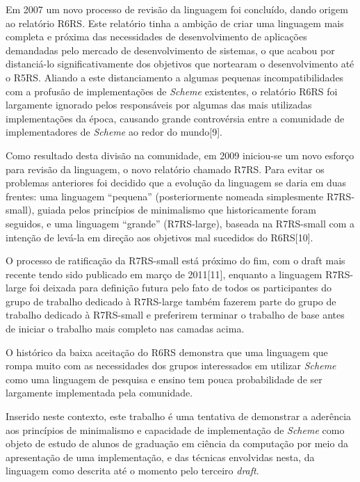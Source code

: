 Em 2007 um novo processo de revisão da linguagem foi concluído, dando origem ao
relatório \acs{R6RS}. Este relatório tinha a ambição de criar uma linguagem
mais completa e próxima das necessidades de desenvolvimento de aplicações
demandadas pelo mercado de desenvolvimento de sistemas, o que acabou por
distanciá-lo significativamente dos objetivos que nortearam o desenvolvimento
até o \acs{R5RS}. Aliando a este distanciamento a algumas pequenas
incompatibilidades com a profusão de implementações de \textit{Scheme}
existentes, o relatório \acs{R6RS} foi largamente ignorado pelos responsáveis
por algumas das mais utilizadas implementações da época, causando grande
controvérsia entre a comunidade de implementadores de \textit{Scheme} ao redor
do mundo[9].

Como resultado desta divisão na comunidade, em 2009 iniciou-se um novo esforço
para revisão da linguagem, o novo relatório chamado \acs{R7RS}. Para evitar os
problemas anteriores foi decidido que a evolução da linguagem se daria em duas
frentes: uma linguagem ``pequena'' (posteriormente nomeada simplesmente
\acs{R7RS}-small), guiada pelos princípios de minimalismo que historicamente
foram seguidos, e uma linguagem ``grande'' (\acs{R7RS}-large), baseada na
R7RS-small com a intenção de levá-la em direção aos objetivos mal sucedidos do
\acs{R6RS}[10]. 

O processo de ratificação da \acs{R7RS}-small está próximo do fim, com o draft
mais recente tendo sido publicado em março de 2011[11], enquanto a linguagem
\acs{R7RS}-large foi deixada para definição futura pelo fato de todos os
participantes do grupo de trabalho dedicado à \acs{R7RS}-large também fazerem
parte do grupo de trabalho dedicado à \acs{R7RS}-small e preferirem terminar o
trabalho de base antes de iniciar o trabalho mais completo nas camadas acima.

O histórico da baixa aceitação do \acs{R6RS} demonstra que uma linguagem que
rompa muito com as necessidades dos grupos interessados em utilizar
\textit{Scheme} como uma linguagem de pesquisa e ensino tem pouca probabilidade
de ser largamente implementada pela comunidade.

Inserido neste contexto, este trabalho é uma tentativa de demonstrar a
aderência aos princípios de minimalismo e capacidade de implementação de
\textit{Scheme} como objeto de estudo de alunos de graduação em ciência da
computação por meio da apresentação de uma implementação, e das técnicas
envolvidas nesta, da linguagem como descrita até o momento pelo terceiro
\textit{draft}. 


